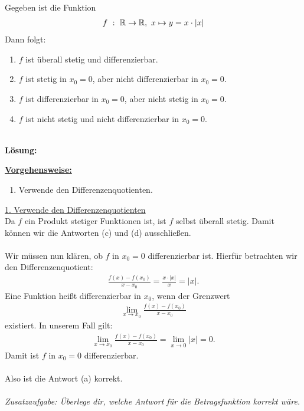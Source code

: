 \subsection*{}
Gegeben ist die Funktion
\begin{align*}
	f \ : \ \mathbb{R} \rightarrow \mathbb{R}, \ x \mapsto y = x \cdot |x| 
\end{align*}
Dann folgt:
\renewcommand{\labelenumi}{(\alph{enumi})}
\begin{enumerate}
	\item 
	$ f $ ist überall stetig und differenzierbar.
	\item
	$ f $ ist stetig in $ x_0 = 0 $, aber nicht differenzierbar in $ x_0 = 0 $.
	\item
	$ f $ ist differenzierbar in $ x_0 = 0 $, aber nicht stetig in $ x_0 = 0 $.
	\item
    $ f $ ist nicht stetig und nicht differenzierbar in $ x_0 = 0 $.
\end{enumerate}
\ \\
\textbf{Lösung:}
\begin{mdframed}
	\underline{\textbf{Vorgehensweise:}}
	\renewcommand{\labelenumi}{\theenumi.}
	\begin{enumerate}
		\item Verwende den Differenzenquotienten.
	\end{enumerate}
\end{mdframed}

\underline{1. Verwende den Differenzenquotienten}\\
Da $ f $ ein Produkt stetiger Funktionen ist, ist $ f $ selbst überall stetig.
Damit können wir die Antworten (c) und (d) ausschließen.\\
\\
Wir müssen nun klären, ob $ f $ in $ x_0 = 0 $ differenzierbar ist. Hierfür betrachten wir den Differenzenquotient:
\begin{align*}
	\frac{f(x) - f(x_0)}{x - x_0 } = \frac{x \cdot |x|}{x} = |x|.
\end{align*}
Eine Funktion heißt differenzierbar in $ x_0 $, wenn der Grenzwert
\begin{align*}
	\lim \limits_{x \to x_0} \frac{f(x) - f(x_0)}{x - x_0 }
\end{align*}
existiert. In unserem Fall gilt:
\begin{align*}
	\lim \limits_{x \to x_0} \frac{f(x) - f(x_0)}{x - x_0 }
	=
	\lim \limits_{x \to 0} |x| = 0.
\end{align*}
Damit ist $ f  $ in $ x_0 = 0 $ differenzierbar.\\
\\
Also ist die Antwort (a) korrekt.\\
\\
\textit{Zusatzaufgabe: Überlege dir, welche Antwort für die Betragsfunktion korrekt wäre.}
\newpage

